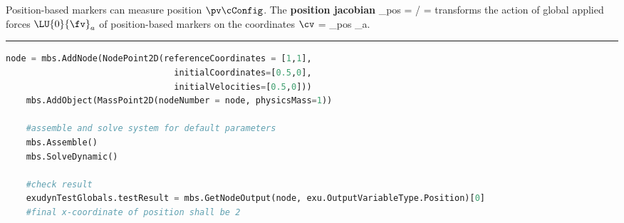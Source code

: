     Position-based markers can measure position $\pv\cConfig$. The {\bf position jacobian}  
    \be
      \Jm_{pos} = \partial \pv\cCur / \partial \cv\cCur = 
    \ee
    transforms the action of global applied forces $\LU{0}{\fv}_a$ of position-based markers on the coordinates $\cv$
    \be
      \Qm = \Jm_{pos} _a.
    \ee
\vspace{6pt}\par\noindent\rule{\textwidth}{0.4pt}
\label{miniExample_ObjectMassPoint2D}
\pythonstyle
\begin{lstlisting}[language=Python, firstnumber=1]
    node = mbs.AddNode(NodePoint2D(referenceCoordinates = [1,1], 
                                 initialCoordinates=[0.5,0],
                                 initialVelocities=[0.5,0]))
    mbs.AddObject(MassPoint2D(nodeNumber = node, physicsMass=1))

    #assemble and solve system for default parameters
    mbs.Assemble()
    mbs.SolveDynamic()

    #check result
    exudynTestGlobals.testResult = mbs.GetNodeOutput(node, exu.OutputVariableType.Position)[0]
    #final x-coordinate of position shall be 2
\end{lstlisting}

